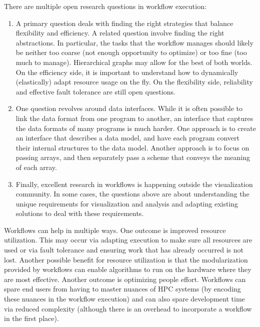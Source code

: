 \begin{refsection}
There are multiple open research questions in workflow execution:
\begin{enumerate}
\item	
A primary question deals with finding the right strategies that balance flexibility and efficiency.  A related question involve finding the right abstractions.  In particular, the tasks that the workflow manages should likely be neither too coarse (not enough opportunity to optimize) or too fine (too much to manage).   Hierarchical graphs may allow for the best of both worlds.  On the efficiency side, it is important to understand how to dynamically (elastically) adapt resource usage on the fly.  On the flexibility side, reliability and effective fault tolerance are still open questions. 
\item
One question revolves around data interfaces.  While it is often possible to link the data format from one program to another, an interface that captures the data formats of many programs is much harder.  One approach is to create an interface that describes a data model, and have each program convert their internal structures to the data model.  Another approach is to focus on passing arrays, and then separately pass a scheme that conveys the meaning of each array.
\item
Finally, excellent research in workflows is happening outside the visualization community.  In some cases, the questions above are about understanding the unique requirements for visualization and analysis and adapting existing solutions to deal with these requirements.
\end{enumerate}

Workflows can help in multiple ways.  One outcome is improved resource utilization. This may occur via adapting execution to make sure all resources are used or via fault tolerance and ensuring work that has already occurred is not lost.  Another possible benefit for resource utilization is that the modularization provided by workflows can enable algorithms to run on the hardware where they are most effective. Another outcome is optimizing people effort.  Workflows can spare end users from having to master nuances of HPC systems (by encoding these nuances in the workflow execution) and can also spare development time via reduced complexity (although there is an overhead to incorporate a workflow in the first place).  

\printbibliography
\end{refsection}
